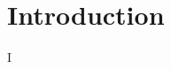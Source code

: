 \documentclass[11pt]{article}
\begin{document}
\title{}
\author{Miles Wu}
\maketitle

\begin{abstract}

\end{abstract}

\newpage

\section{Introduction}


\begin{thebibliography}{9}
		I
\end{thebibliography}
\end{document}
